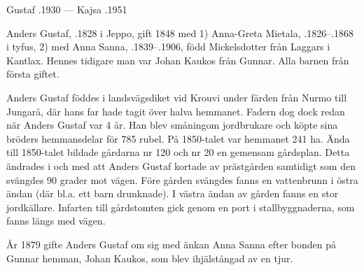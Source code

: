 Gustaf .1930  ---  Kajsa .1951


Anders Gustaf, .1828 i Jeppo, gift 1848 med 1) Anna-Greta Mietala, .1826--.1868 i tyfus, 2) med Anna Sanna, .1839--.1906, född Mickelsdotter från Laggars i Kantlax. Hennes tidigare man var Johan Kaukos från Gunnar. Alla barnen från första giftet.
\begin{jhchildren}
  \item {}
  \item {}
  \item {}
  \item {}
  \item {}
  \item {}
  \item {}
  \item {}
  \item {}
  \item {}
\end{jhchildren}
Anders Gustaf föddes i landsvägsdiket vid Krouvi under färden från Nurmo till Jungarå, där hans far hade tagit över halva hemmanet. Fadern dog dock redan när Anders Gustaf var 4 år. Han blev småningom jordbrukare och köpte sina bröders hemmansdelar för 785 rubel. På 1850-talet var hemmanet 241 ha. Ända till 1850-talet bildade gårdarna nr 120 och nr 20 en gemensam gårdsplan. Detta ändrades i och med att Anders Gustaf kortade av prästgården samtidigt som den svängdes 90 grader mot vägen. Före gården svängdes fanns en vattenbrunn i östra ändan (där bl.a. ett barn drunknade). I västra ändan av gården fanns en stor jordkällare. Infarten till gårdstomten gick genom en port i stallbyggnaderna, som fanns längs med vägen.

År 1879 gifte Anders Gustaf om sig med änkan Anna Sanna efter bonden på Gunnar hemman, Johan Kaukos, som blev ihjälstångad av en tjur.

